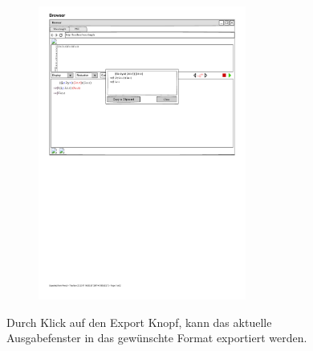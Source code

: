 \documentclass[parskip=full,11pt,twoside]{scrartcl}
\begin{document}
\begin{figure}[H]
\begin{subfigure}{0.75\textwidth}
		\includegraphics[width=0.75\textwidth]{img/wavelength_export_window_unicode}
	\end{subfigure}
	\caption{\label{fig:export}Durch Klick auf den Export Knopf, kann das aktuelle Ausgabefenster in das gewünschte Format exportiert werden.}
\end{figure}
\end{document}
